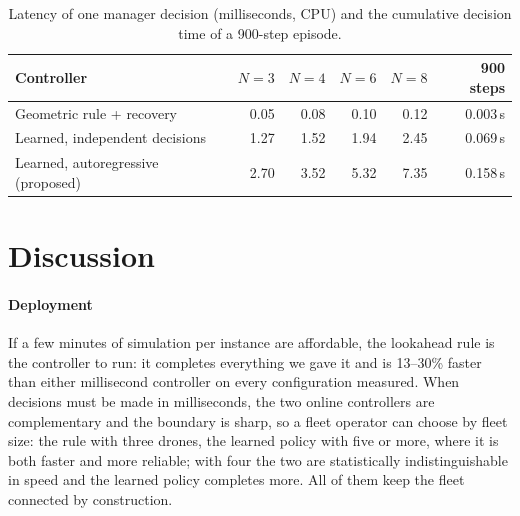 \documentclass[final,5p,times,twocolumn]{elsarticle}
\begin{document}
\begin{table}[t]
\centering
\caption{Latency of one manager decision (milliseconds, CPU) and the cumulative decision time of
a 900-step episode.}
\label{tab:latency}
\small
\begin{tabular}{lrrrrr}
\toprule
Controller & $N=3$ & $N=4$ & $N=6$ & $N=8$ & 900 steps \\
\midrule
Geometric rule + recovery & 0.05 & 0.08 & 0.10 & 0.12 & 0.003\,s \\
Learned, independent decisions & 1.27 & 1.52 & 1.94 & 2.45 & 0.069\,s \\
Learned, autoregressive (proposed) & 2.70 & 3.52 & 5.32 & 7.35 & 0.158\,s \\
\bottomrule
\end{tabular}
\end{table}

\section{Discussion}
\label{sec:discussion}

\paragraph{Deployment}
If a few minutes of simulation per instance are affordable, the lookahead rule is the controller
to run: it completes everything we gave it and is 13--30\% faster than either millisecond
controller on every configuration measured. When decisions must be made in milliseconds, the
two online controllers are complementary and the boundary is sharp, so a fleet operator can
choose by fleet size: the rule with three drones, the learned policy with five or more, where it
is both faster and more reliable; with four the two are statistically indistinguishable in speed
and the learned policy completes more. All of them keep the fleet connected by construction.
\end{document}
